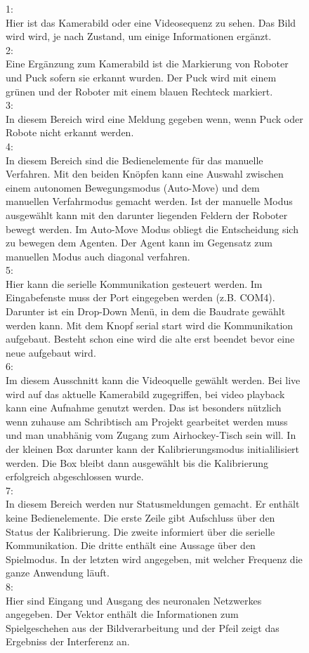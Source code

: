 \begin{figure}
1:\\
Hier ist das Kamerabild oder eine Videosequenz zu sehen. Das Bild wird wird, je nach Zustand, um einige Informationen ergänzt.\\
2:\\
Eine Ergänzung zum Kamerabild ist die Markierung von Roboter und Puck sofern sie erkannt wurden. Der Puck wird mit einem grünen und der Roboter mit einem blauen Rechteck markiert.
\\
3:\\
In diesem Bereich wird eine Meldung gegeben wenn, wenn Puck oder Robote nicht erkannt werden.\\
4:\\
In diesem Bereich sind die Bedienelemente für das manuelle Verfahren. Mit den beiden Knöpfen kann eine Auswahl zwischen einem autonomen Bewegungsmodus (Auto-Move) und dem manuellen Verfahrmodus gemacht werden. Ist der manuelle Modus ausgewählt kann mit den darunter liegenden Feldern der Roboter bewegt werden. Im Auto-Move Modus obliegt die Entscheidung sich zu bewegen dem Agenten. Der Agent kann im Gegensatz zum manuellen Modus auch diagonal verfahren. \\
5:\\
Hier kann die serielle Kommunikation gesteuert werden. Im Eingabefenste muss der Port eingegeben werden (z.B. COM4). Darunter ist ein Drop-Down Menü, in dem die Baudrate gewählt werden kann. Mit dem Knopf serial start wird die Kommunikation aufgebaut. Besteht schon eine wird die alte erst beendet bevor eine neue aufgebaut wird.\\
6:\\
Im diesem Ausschnitt kann die Videoquelle gewählt werden. Bei live wird auf das aktuelle Kamerabild zugegriffen, bei video playback kann eine Aufnahme genutzt werden. Das ist besonders nützlich wenn zuhause am Schribtisch  am Projekt gearbeitet werden muss und man unabhänig vom Zugang zum Airhockey-Tisch sein will. In der kleinen Box darunter kann der Kalibrierungsmodus initialilisiert werden. Die Box bleibt dann ausgewählt bis die  Kalibrierung erfolgreich abgeschlossen wurde.\\
7:\\
In diesem Bereich werden nur Statusmeldungen gemacht. Er enthält keine Bedienelemente. Die erste Zeile gibt Aufschluss über den Status der Kalibrierung. Die zweite informiert über die serielle Kommunikation. Die dritte enthält eine Aussage über den Spielmodus. In der letzten wird angegeben, mit welcher Frequenz die ganze Anwendung läuft.\\
8:\\
Hier sind Eingang und Ausgang des neuronalen Netzwerkes angegeben. Der Vektor enthält die Informationen zum Spielgeschehen aus der Bildverarbeitung und der Pfeil zeigt das Ergebniss der Interferenz an. 
\end{figure}
\clearpage

